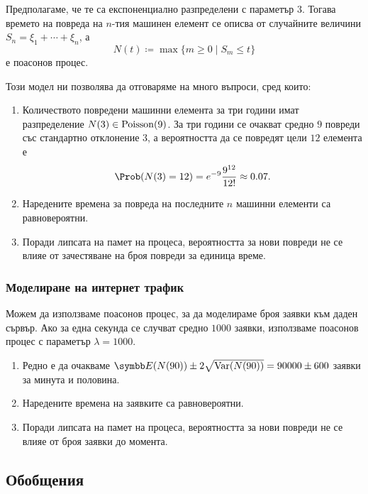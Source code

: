 \documentclass[numbers=endperiod, bibliography=totocnumbered]{scrartcl}
\begin{document}
Предполагаме, че те са експоненциално разпределени с параметър \( 3 \). Тогава времето на повреда на \( n \)-тия машинен елемент се описва от случайните величини \( S_n = \xi_1 + \cdots + \xi_n \), а
\begin{equation*}
  N(t) \coloneqq \max \{ m \geq 0 \mid S_m \leq t \}
\end{equation*}
е поасонов процес.

Този модел ни позволява да отговаряме на много въпроси, сред които:
\begin{enumerate}
  \item Количеството повредени машинни елемента за три години имат разпределение \( N(3) \in \operatorname{Poisson}(9) \). За три години се очакват средно \( 9 \) повреди със стандартно отклонение \( 3 \), а вероятността да се повредят цели \( 12 \) елемента е
  \begin{equation*}
    \Prob(N(3) = 12) = e^{-9} \frac {9^{12}} {12!} \approx 0.07.
  \end{equation*}

  \item Наредените времена за повреда на последните \( n \) машинни елементи са равновероятни.
  \item Поради липсата на памет на процеса, вероятността за нови повреди не се влияе от зачестяване на броя повреди за единица време.
\end{enumerate}

\subsubsection{Моделиране на интернет трафик}

Можем да използваме поасонов процес, за да моделираме броя заявки към даден сървър. Ако за една секунда се случват средно \( 1000 \) заявки, използваме поасонов процес с параметър \( \lambda = 1000 \).
\begin{enumerate}
  \item Редно е да очакваме \( \Expect(N(90)) \pm 2\sqrt{\Var(N(90))} = 90000 \pm 600 \) заявки за минута и половина.
  \item Наредените времена на заявките са равновероятни.
  \item Поради липсата на памет на процеса, вероятността за нови повреди не се влияе от броя заявки до момента.
\end{enumerate}

\subsection{Обобщения}
\end{document}
